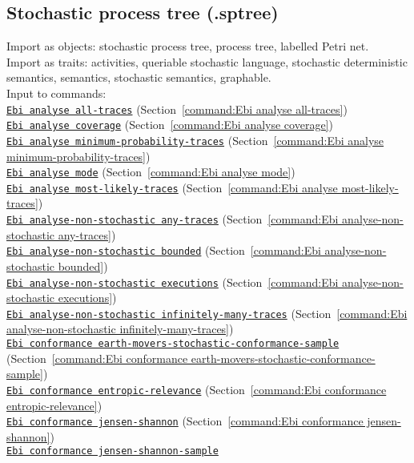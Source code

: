 {\subsection{Stochastic process tree (.sptree)}
\label{filehandler:stochastic process tree}
Import as objects: stochastic process tree, process tree, labelled Petri net.
\\Import as traits: activities, queriable stochastic language, stochastic deterministic semantics, semantics, stochastic semantics, graphable.
\\Input to commands: \\\null\qquad\hyperref[command:Ebi analyse all-traces]{\texttt{Ebi analyse all-traces}} (Section~\ref{command:Ebi analyse all-traces})\\\null\qquad\hyperref[command:Ebi analyse coverage]{\texttt{Ebi analyse coverage}} (Section~\ref{command:Ebi analyse coverage})\\\null\qquad\hyperref[command:Ebi analyse minimum-probability-traces]{\texttt{Ebi analyse minimum-probability-traces}} (Section~\ref{command:Ebi analyse minimum-probability-traces})\\\null\qquad\hyperref[command:Ebi analyse mode]{\texttt{Ebi analyse mode}} (Section~\ref{command:Ebi analyse mode})\\\null\qquad\hyperref[command:Ebi analyse most-likely-traces]{\texttt{Ebi analyse most-likely-traces}} (Section~\ref{command:Ebi analyse most-likely-traces})\\\null\qquad\hyperref[command:Ebi analyse-non-stochastic any-traces]{\texttt{Ebi analyse-non-stochastic any-traces}} (Section~\ref{command:Ebi analyse-non-stochastic any-traces})\\\null\qquad\hyperref[command:Ebi analyse-non-stochastic bounded]{\texttt{Ebi analyse-non-stochastic bounded}} (Section~\ref{command:Ebi analyse-non-stochastic bounded})\\\null\qquad\hyperref[command:Ebi analyse-non-stochastic executions]{\texttt{Ebi analyse-non-stochastic executions}} (Section~\ref{command:Ebi analyse-non-stochastic executions})\\\null\qquad\hyperref[command:Ebi analyse-non-stochastic infinitely-many-traces]{\texttt{Ebi analyse-non-stochastic infinitely-many-traces}} (Section~\ref{command:Ebi analyse-non-stochastic infinitely-many-traces})\\\null\qquad\hyperref[command:Ebi conformance earth-movers-stochastic-conformance-sample]{\texttt{Ebi conformance earth-movers-stochastic-conformance-sample}} (Section~\ref{command:Ebi conformance earth-movers-stochastic-conformance-sample})\\\null\qquad\hyperref[command:Ebi conformance entropic-relevance]{\texttt{Ebi conformance entropic-relevance}} (Section~\ref{command:Ebi conformance entropic-relevance})\\\null\qquad\hyperref[command:Ebi conformance jensen-shannon]{\texttt{Ebi conformance jensen-shannon}} (Section~\ref{command:Ebi conformance jensen-shannon})\\\null\qquad\hyperref[command:Ebi conformance jensen-shannon-sample]{\texttt{Ebi conformance jensen-shannon-sample}} }
